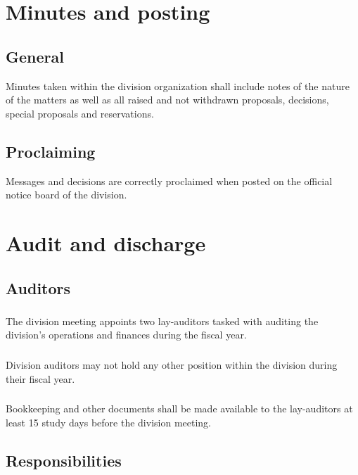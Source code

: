 \documentclass[a4paper]{dtek}
\begin{document}
\newpage

\section{Minutes and posting}
\subsection{General}
Minutes taken within the division organization shall include notes of the nature of the matters as well as all raised and not withdrawn proposals, decisions, special proposals and reservations. 


\subsection{Proclaiming}
Messages and decisions are correctly proclaimed when posted on the official notice board of the division. 

\newpage

\section{Audit and discharge}
\subsection{Auditors}
\subsubsection{}
The division meeting appoints two lay-auditors tasked with auditing the division's operations and finances during the fiscal year. 

\subsubsection{}
Division auditors may not hold any other position within the division during their fiscal year. 

\subsubsection{}
Bookkeeping and other documents shall be made available to the lay-auditors at least 15 study days before the division meeting. 

\subsection{Responsibilities}
\end{document}
